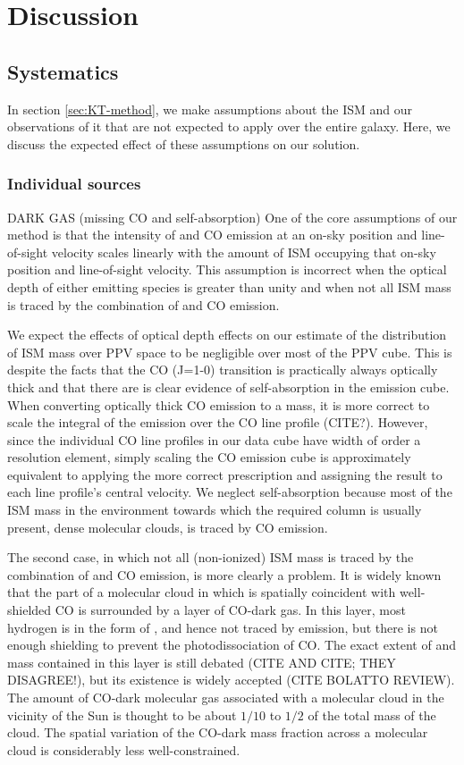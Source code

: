 \section{Discussion}
\label{sec:discussion}

\subsection{Systematics}
\label{sec:discussion-systematics}
In section \ref{sec:KT-method}, we make assumptions about the ISM and our observations of it that are not expected to apply over the entire galaxy. Here, we discuss the expected effect of these assumptions on our solution.
\subsubsection{Individual sources}
DARK GAS (missing CO and \atomH self-absorption)
One of the core assumptions of our method is that the intensity of \atomH and CO emission at an on-sky position and line-of-sight velocity scales linearly with the amount of ISM occupying that on-sky position and line-of-sight velocity. This assumption is incorrect when the optical depth of either emitting species is greater than unity and when not all ISM mass is traced by the combination of \atomH and CO emission. 

We expect the effects of optical depth effects on our estimate of the distribution of ISM mass over PPV space to be negligible over most of the PPV cube. This is despite the facts that the CO (J=1-0) transition is practically always optically thick and that there are is clear evidence of \atomH self-absorption in the \atomH emission cube. When converting optically thick CO emission to a \molH mass, it is more correct to scale the integral of the emission over the CO line profile (CITE?). However, since the individual CO line profiles in our data cube have width of order a resolution element, simply scaling the CO emission cube is approximately equivalent to applying the more correct prescription and assigning the result to each line profile's central velocity. We neglect \atomH self-absorption because most of the ISM mass in the environment towards which the required \atomH column is usually present, dense molecular clouds, is traced by CO emission. 

The second case, in which not all (non-ionized) ISM mass is traced by the combination of \atomH and CO emission, is more clearly a problem. It is widely known that the part of a molecular cloud in which \molH is spatially coincident with well-shielded CO is surrounded by a layer of CO-dark gas. In this layer, most hydrogen is in the form of \molH, and hence not traced by \atomH emission, but there is not enough shielding to prevent the photodissociation of CO. The exact extent of and mass contained in this layer is still debated (CITE AND CITE; THEY DISAGREE!), but its existence is widely accepted (CITE BOLATTO REVIEW). The amount of CO-dark molecular gas associated with a molecular cloud in the vicinity of the Sun is thought to be about $1/10$ to $1/2$ of the total mass of the cloud. The spatial variation of the CO-dark mass fraction across a molecular cloud is considerably less well-constrained.

